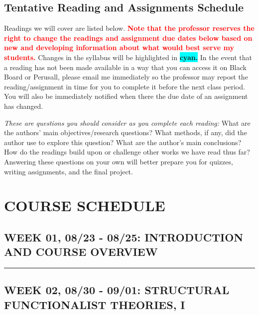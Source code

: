 \documentclass[11pt,]{article}
\begin{document}
\hypertarget{tentative-reading-and-assignments-schedule}{%
\subsection{Tentative Reading and Assignments
Schedule}\label{tentative-reading-and-assignments-schedule}}

Readings we will cover are listed below.
\textcolor{red}{\bf{Note that the professor reserves the right to change the readings and assignment due dates below based on new and developing information about what would best serve my students.}}
Changes in the syllabus will be highlighted in
\colorbox{Cyan}{\bf{cyan.}} In the event that a reading has not been
made available in a way that you can access it on Black Board or
Perusall, please email me immediately so the professor may repost the
reading/assignment in time for you to complete it before the next class
period. You will also be immediately notified when there the due date of
an assignment has changed.

\emph{These are questions you should consider as you complete each
reading:} What are the authors' main objectives/research questions? What
methods, if any, did the author use to explore this question? What are
the author's main conclusions? How do the readings build upon or
challenge other works we have read thus far? Answering these questions
on your own will better prepare you for quizzes, writing assignments,
and the final project.

\hypertarget{course-schedule}{%
\section{COURSE SCHEDULE}\label{course-schedule}}

\bigbreak

\hypertarget{week-01-0823---0825-introduction-and-course-overview}{%
\subsection{WEEK 01, 08/23 - 08/25: INTRODUCTION AND COURSE
OVERVIEW}\label{week-01-0823---0825-introduction-and-course-overview}}

\bigbreak
\hrule

\hypertarget{week-02-0830---0901-structural-functionalist-theories-i}{%
\subsection{WEEK 02, 08/30 - 09/01: STRUCTURAL FUNCTIONALIST THEORIES,
I}\label{week-02-0830---0901-structural-functionalist-theories-i}}
\end{document}
